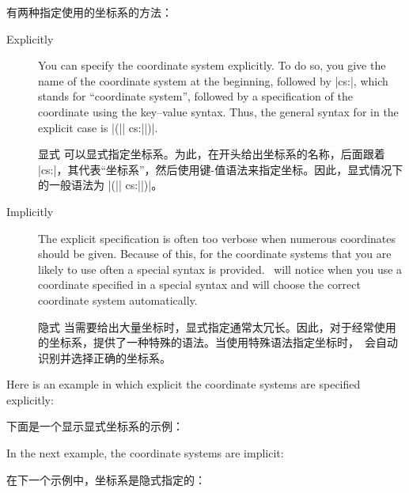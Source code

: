 有两种指定使用的坐标系的方法：
%
\begin{description}
    \item[Explicitly] You can specify the coordinate system explicitly. To do
        so, you give the name of the coordinate system at the beginning,
        followed by |cs:|, which stands for ``coordinate system'', followed by
        a specification of the coordinate using the key--value syntax. Thus,
        the general syntax for  in the explicit
        case is |(|| cs:||)|.

        {显式} 可以显式指定坐标系。为此，在开头给出坐标系的名称，后面跟着 |cs:|，其代表``坐标系''，然后使用键-值语法来指定坐标。因此，显式情况下  的一般语法为 |(|| cs:||)|。
    \item[Implicitly] The explicit specification is often too verbose when
        numerous coordinates should be given. Because of this, for the
        coordinate systems that you are likely to use often a special syntax
        is provided. \tikzname\ will notice when you use a coordinate
        specified in a special syntax and will choose the correct coordinate
        system automatically.

        {隐式} 当需要给出大量坐标时，显式指定通常太冗长。因此，对于经常使用的坐标系，提供了一种特殊的语法。当使用特殊语法指定坐标时，\tikzname\ 会自动识别并选择正确的坐标系。
\end{description}

Here is an example in which explicit the coordinate systems are specified
explicitly:

下面是一个显示显式坐标系的示例：

%
\begin{codeexample}[]
\end{codeexample}
%
In the next example, the coordinate systems are implicit:

在下一个示例中，坐标系是隐式指定的：

%
\begin{codeexample}[]
\end{codeexample}

